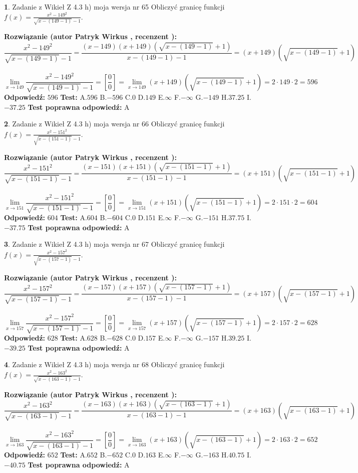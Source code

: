 \documentclass[12pt, a4paper]{article}
\theoremstyle{definition} %
\newtheorem{zad}{}
\newcommand{\zadStart}[1]{\begin{zad}#1\newline}
\newcommand{\zadStop}{\end{zad}}
\newcommand{\rozwStart}[2]{\noindent \textbf{Rozwiązanie (autor #1 , recenzent #2): }\newline}
\newcommand{\rozwStop}{\newline}
\newcommand{\odpStart}{\noindent \textbf{Odpowiedź:}\newline}
\newcommand{\odpStop}{\newline}
\newcommand{\testStart}{\noindent \textbf{Test:}\newline}
\newcommand{\testStop}{\newline}
\newcommand{\kluczStart}{\noindent \textbf{Test poprawna odpowiedź:}\newline}
\newcommand{\kluczStop}{\newline}
\begin{document}
\zadStart{Zadanie z Wikieł Z 4.3 h) moja wersja nr 65}
Obliczyć granicę funkcji $f(x)=\frac{x^{2} - 149^{2}}{\sqrt{x-(149-1)}-1}$.
\zadStop
\rozwStart{Patryk Wirkus}{}
$$\frac{x^{2} - 149^{2}}{\sqrt{x-(149-1)}-1}=\frac{(x-149)(x+149)(\sqrt{x-(149-1)}+1)}{x-(149-1)-1}=(x+149)(\sqrt{x-(149-1)}+1)$$
\\
$$\lim\limits_{x\to 149}\frac{x^{2} - 149^{2}}{\sqrt{x-(149-1)}-1}=[\frac{0}{0}]=
\lim\limits_{x\to 149}(x+149)(\sqrt{x-(149-1)}+1) = 2\cdot149 \cdot 2 = 596$$
\rozwStop
\odpStart
$596$
\odpStop
\testStart
A.$596$
B.$-596$
C.$0$
D.$149$
E.$\infty$
F.$-\infty$
G.$-149$
H.$37.25$
I.$-37.25$
\testStop
\kluczStart
A
\kluczStop



\zadStart{Zadanie z Wikieł Z 4.3 h) moja wersja nr 66}
Obliczyć granicę funkcji $f(x)=\frac{x^{2} - 151^{2}}{\sqrt{x-(151-1)}-1}$.
\zadStop
\rozwStart{Patryk Wirkus}{}
$$\frac{x^{2} - 151^{2}}{\sqrt{x-(151-1)}-1}=\frac{(x-151)(x+151)(\sqrt{x-(151-1)}+1)}{x-(151-1)-1}=(x+151)(\sqrt{x-(151-1)}+1)$$
\\
$$\lim\limits_{x\to 151}\frac{x^{2} - 151^{2}}{\sqrt{x-(151-1)}-1}=[\frac{0}{0}]=
\lim\limits_{x\to 151}(x+151)(\sqrt{x-(151-1)}+1) = 2\cdot151 \cdot 2 = 604$$
\rozwStop
\odpStart
$604$
\odpStop
\testStart
A.$604$
B.$-604$
C.$0$
D.$151$
E.$\infty$
F.$-\infty$
G.$-151$
H.$37.75$
I.$-37.75$
\testStop
\kluczStart
A
\kluczStop



\zadStart{Zadanie z Wikieł Z 4.3 h) moja wersja nr 67}
Obliczyć granicę funkcji $f(x)=\frac{x^{2} - 157^{2}}{\sqrt{x-(157-1)}-1}$.
\zadStop
\rozwStart{Patryk Wirkus}{}
$$\frac{x^{2} - 157^{2}}{\sqrt{x-(157-1)}-1}=\frac{(x-157)(x+157)(\sqrt{x-(157-1)}+1)}{x-(157-1)-1}=(x+157)(\sqrt{x-(157-1)}+1)$$
\\
$$\lim\limits_{x\to 157}\frac{x^{2} - 157^{2}}{\sqrt{x-(157-1)}-1}=[\frac{0}{0}]=
\lim\limits_{x\to 157}(x+157)(\sqrt{x-(157-1)}+1) = 2\cdot157 \cdot 2 = 628$$
\rozwStop
\odpStart
$628$
\odpStop
\testStart
A.$628$
B.$-628$
C.$0$
D.$157$
E.$\infty$
F.$-\infty$
G.$-157$
H.$39.25$
I.$-39.25$
\testStop
\kluczStart
A
\kluczStop



\zadStart{Zadanie z Wikieł Z 4.3 h) moja wersja nr 68}
Obliczyć granicę funkcji $f(x)=\frac{x^{2} - 163^{2}}{\sqrt{x-(163-1)}-1}$.
\zadStop
\rozwStart{Patryk Wirkus}{}
$$\frac{x^{2} - 163^{2}}{\sqrt{x-(163-1)}-1}=\frac{(x-163)(x+163)(\sqrt{x-(163-1)}+1)}{x-(163-1)-1}=(x+163)(\sqrt{x-(163-1)}+1)$$
\\
$$\lim\limits_{x\to 163}\frac{x^{2} - 163^{2}}{\sqrt{x-(163-1)}-1}=[\frac{0}{0}]=
\lim\limits_{x\to 163}(x+163)(\sqrt{x-(163-1)}+1) = 2\cdot163 \cdot 2 = 652$$
\rozwStop
\odpStart
$652$
\odpStop
\testStart
A.$652$
B.$-652$
C.$0$
D.$163$
E.$\infty$
F.$-\infty$
G.$-163$
H.$40.75$
I.$-40.75$
\testStop
\kluczStart
A
\kluczStop
\end{document}
